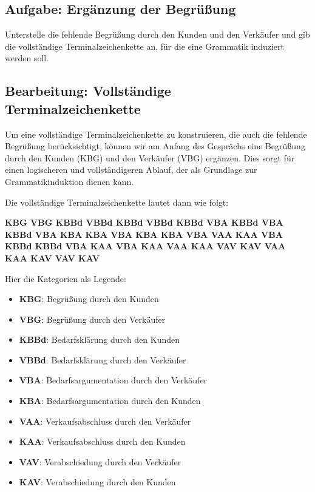 \documentclass[
]{article}
\begin{document}
\subsection{Aufgabe: Ergänzung der Begrüßung}\label{aufgabe-ergaenzung-der-begruessung}

Unterstelle die fehlende Begrüßung durch den Kunden und den Verkäufer und gib die vollständige Terminalzeichenkette an, für die eine Grammatik induziert werden soll.

\subsection{Bearbeitung: Vollständige Terminalzeichenkette}\label{bearbeitung-vollstaendige-terminalzeichenkette}

Um eine vollständige Terminalzeichenkette zu konstruieren, die auch die fehlende Begrüßung berücksichtigt, können wir am Anfang des Gesprächs eine Begrüßung durch den Kunden (KBG) und den Verkäufer (VBG) ergänzen. Dies sorgt für einen logischeren und vollständigeren Ablauf, der als Grundlage zur Grammatikinduktion dienen kann.

Die vollständige Terminalzeichenkette lautet dann wie folgt:

\textbf{KBG VBG KBBd VBBd KBBd VBBd KBBd VBA KBBd VBA KBBd VBA KBA KBA VBA KBA KBA VBA VAA KAA VBA KBBd KBBd VBA KAA VBA KAA VAA KAA VAV KAV VAA KAA KAV VAV KAV}

Hier die Kategorien als Legende:

\begin{itemize}
\item
  \textbf{KBG}: Begrüßung durch den Kunden
\item
  \textbf{VBG}: Begrüßung durch den Verkäufer
\item
  \textbf{KBBd}: Bedarfsklärung durch den Kunden
\item
  \textbf{VBBd}: Bedarfsklärung durch den Verkäufer
\item
  \textbf{VBA}: Bedarfsargumentation durch den Verkäufer
\item
  \textbf{KBA}: Bedarfsargumentation durch den Kunden
\item
  \textbf{VAA}: Verkaufsabschluss durch den Verkäufer
\item
  \textbf{KAA}: Verkaufsabschluss durch den Kunden
\item
  \textbf{VAV}: Verabschiedung durch den Verkäufer
\item
  \textbf{KAV}: Verabschiedung durch den Kunden
\end{itemize}
\end{document}

